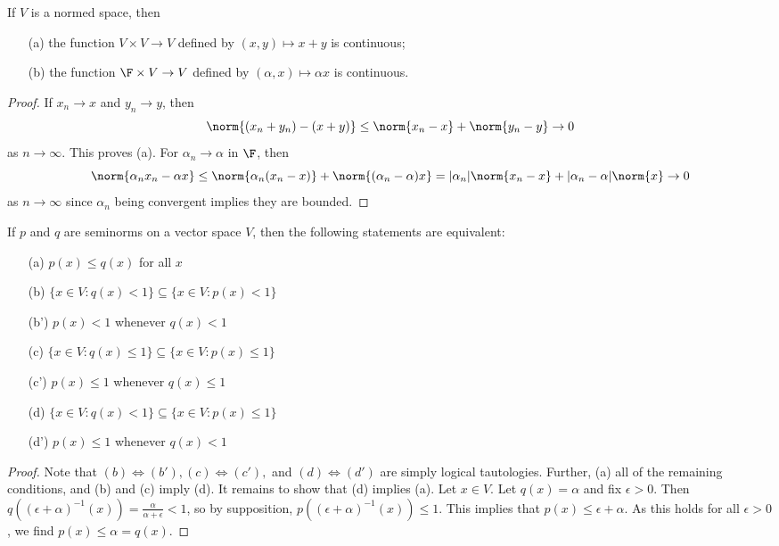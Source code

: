\begin{prop}
    If $V$ is a normed space, then \begin{enumerate}
        \item[(a)] the function $V\times V\rightarrow V$ defined by $(x,y)\mapsto x+y$ is continuous;
        \item[(b)] the function $\F\times V\rightarrow V$ defined by $(\alpha,x)\mapsto \alpha x$ is continuous.
    \end{enumerate}
\end{prop}
\begin{proof}
    If $x_n\rightarrow x$ and $y_n\rightarrow y$, then $$\norm{(x_n+y_n)-(x+y)} \leq \norm{x_n-x}+\norm{y_n-y}\rightarrow 0$$
    as $n\rightarrow \infty$. This proves (a). For $\alpha_n\rightarrow \alpha$ in $\F$, then $$\norm{\alpha_nx_n-\alpha x} \leq \norm{\alpha_n(x_n-x)} + \norm{(\alpha_n-\alpha)x} = |\alpha_n|\norm{x_n-x}+|\alpha_n-\alpha|\norm{x}\rightarrow 0$$
    as $n\rightarrow \infty$ since $\alpha_n$ being convergent implies they are bounded.
\end{proof}

\begin{lem}
    If $p$ and $q$ are seminorms on a vector space $V$, then the following statements are equivalent: \begin{enumerate}
        \item[(a)] $p(x) \leq q(x)$ for all $x$
        \item[(b)] $\{x \in V:q(x) < 1\} \subseteq \{x \in V:p(x) < 1\}$
        \item[(b')] $p(x) < 1$ whenever $q(x) < 1$
        \item[(c)] $\{x\in V:q(x) \leq 1\} \subseteq \{x \in V:p(x) \leq 1\}$
        \item[(c')] $p(x) \leq 1$ whenever $q(x) \leq 1$
        \item[(d)] $\{x\in V:q(x) < 1\} \subseteq \{x \in V:p(x) \leq 1\}$
        \item[(d')] $p(x) \leq 1$ whenever $q(x) < 1$
    \end{enumerate}
\end{lem}
\begin{proof}
    Note that $(b) \iff (b'),(c) \iff (c'),$ and $(d) \iff (d')$ are simply logical tautologies. Further, (a) all of the remaining conditions, and (b) and (c) imply (d). It remains to show that (d) implies (a). Let $x \in V$. Let $q(x) = \alpha$ and fix $\epsilon > 0$. Then $q((\epsilon+\alpha)^{-1}(x)) = \frac{\alpha}{\alpha+\epsilon} < 1$, so by supposition, $p((\epsilon+\alpha)^{-1}(x)) \leq 1$. This implies that $p(x) \leq \epsilon+\alpha$. As this holds for all $\epsilon > 0$, we find $p(x) \leq \alpha = q(x)$.
\end{proof}

